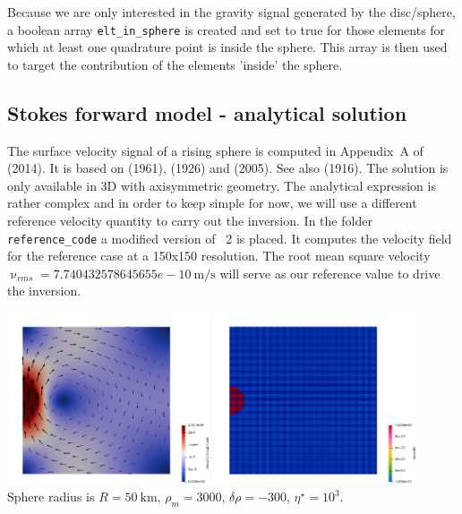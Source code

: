Because we are only interested in the gravity signal generated by the disc/sphere, 
a boolean array {\tt elt\_in\_sphere} is created and set to true for those elements
for which at least one quadrature point is inside the sphere. This array is then used
to target the contribution of the elements 'inside' the sphere. 



\subsection*{Stokes forward model - analytical solution}

The surface velocity signal of a rising sphere is computed in Appendix~A of \textcite{bakp14} (2014).
It is based on \textcite{bren61} (1961), \textcite{stje26} (1926) and \textcite{pacy05} (2005). See also 
\textcite{burg16} (1916). The solution is only available in 3D with axisymmetric geometry. 
The analytical expression is rather complex and in order to keep simple for now, we
will use a different reference velocity quantity to carry out the inversion. 
In the folder {\tt reference\_code} a modified version of \stone~2 is placed. 
It computes the velocity field for the reference case
at a 150x150 resolution. The root mean square velocity 
$\upnu_{rms}=7.740432578645655e-10~\si{\meter\per\second}$ 
will serve as our reference value to drive the inversion.

\begin{center}
\includegraphics[width=6cm]{python_codes/fieldstone_114/reference_code/vel}
\includegraphics[width=6cm]{python_codes/fieldstone_114/reference_code/eta}\\
{\captionfont Sphere radius is $R=50~\si{\km}$, $\rho_m=3000$, $\delta\rho=-300$, $\eta^\star=10^3$.}
\end{center}

